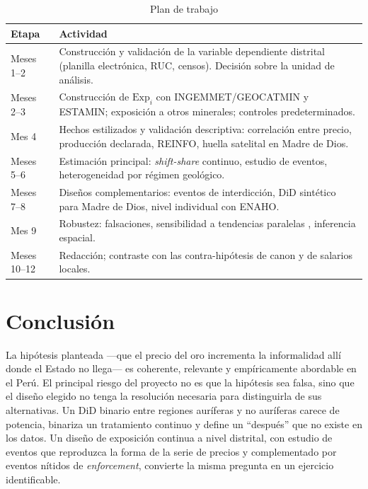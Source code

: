 \documentclass[11pt,a4paper]{article}
\newcommand{\Exp}{\mathrm{Exp}}
\begin{document}
\begin{table}[h!]
\centering
\singlespacing
\caption{Plan de trabajo}
\label{tab:cronograma}
\small
\begin{tabularx}{\textwidth}{L{2.4cm} X}
\toprule
\textbf{Etapa} & \textbf{Actividad} \\
\midrule
Meses 1--2 & Construcción y validación de la variable dependiente distrital (planilla electrónica, RUC, censos). Decisión sobre la unidad de análisis. \\
Meses 2--3 & Construcción de $\Exp_i$ con INGEMMET/\allowbreak GEOCATMIN y ESTAMIN; exposición a otros minerales; controles predeterminados. \\
Mes 4 & Hechos estilizados y validación descriptiva: correlación entre precio, producción declarada, REINFO, huella satelital en Madre de Dios. \\
Meses 5--6 & Estimación principal: \emph{shift-share} continuo, estudio de eventos, heterogeneidad por régimen geológico. \\
Meses 7--8 & Diseños complementarios: eventos de interdicción, DiD sintético para Madre de Dios, nivel individual con ENAHO. \\
Mes 9 & Robustez: falsaciones, sensibilidad a tendencias paralelas \citep{rambachan2023}, inferencia espacial. \\
Meses 10--12 & Redacción; contraste con las contra-hipótesis de canon y de salarios locales. \\
\bottomrule
\end{tabularx}
\end{table}

\section{Conclusión}

La hipótesis planteada ---que el precio del oro incrementa la informalidad allí donde el Estado no llega--- es coherente, relevante y empíricamente abordable en el Perú. El principal riesgo del proyecto no es que la hipótesis sea falsa, sino que el diseño elegido no tenga la resolución necesaria para distinguirla de sus alternativas. Un DiD binario entre regiones auríferas y no auríferas carece de potencia, binariza un tratamiento continuo y define un ``después'' que no existe en los datos. Un diseño de exposición continua a nivel distrital, con estudio de eventos que reproduzca la forma de la serie de precios y complementado por eventos nítidos de \emph{enforcement}, convierte la misma pregunta en un ejercicio identificable.
\end{document}
